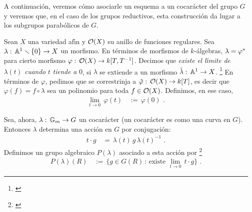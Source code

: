 \theoremstyle{plain}
\newtheorem{teoElGrupoDeUnaCurva}{Teorema}[section]
\newtheorem{propoCocaracteresYParabolicosPropios}[teoElGrupoDeUnaCurva]%
	{Proposici\'{o}n}
\newtheorem{teoParabolicoSemidirecto}[teoElGrupoDeUnaCurva]{Proposici\'{o}n}

\theoremstyle{definition}
\newtheorem{defReductivo}[teoElGrupoDeUnaCurva]{Definici\'{o}n}
\newtheorem{ejemploCurvas}[teoElGrupoDeUnaCurva]{Ejemplo}
\newtheorem{obsParabolicoSemidirecto}[teoElGrupoDeUnaCurva]{Observaci\'{o}n}


A continuaci\'{o}n, veremos c\'{o}mo asociarle un esquema a un cocar\'{a}cter
del grupo $G$ y veremos que, en el caso de los grupos reductivos, esta
construcci\'{o}n da lugar a los subgrupos parab\'{o}licos de $G$.

Sean $X$ una variedad af\'{\i}n y $\cal O(X)$ su anillo de funciones regulares.
Sea $\lambda:\,\afin[1]\setmin\{0\}\rightarrow X$ un morfismo. En t\'{e}rminos
de morfismos de $k$-\'{a}lgebras, $\lambda=\pull\varphi$ para cierto morfismo
$\varphi:\,\cal O(X)\rightarrow k[T,T^{-1}]$. Decimos que \emph{existe el %
l\'{\i}mite de $\lambda(t)$ cuando $t$ tiende a $0$}, si $\lambda$ se extiende
a un morfismo $\tilde\lambda:\,\afin[1]\rightarrow X$.%
\footnote{
	\cite[\S~13.b]{MilneAlgebraicGroups}
}
En t\'{e}rminos de $\varphi$, pedimos que se correstrinja a
$\tilde\varphi:\,\cal O(X)\rightarrow k[T]$, es decir que
$\varphi(f)=f\circ\lambda$ sea un polinomio para toda $f\in\cal O(X)$.
Definimos, en ese caso,
\begin{align*}
	\lim_{t\to 0}\,\varphi(t) & \,:=\,\varphi(0)
	\text{ .}
\end{align*}
%

Sea, ahora, $\lambda:\,\multiplicativo\rightarrow G$ un cocar\'{a}cter (un
cocar\'{a}cter es como una curva en $G$). Entonces $\lambda$ determina una
acci\'{o}n en $G$ por conjugaci\'{o}n:
\begin{align*}
	t\cdot g & \,=\,\lambda(t)\,g\,\lambda(t)^{-1}
	\text{ .}
\end{align*}
%
Definimos un grupo algebraico $P(\lambda)$ asociado a esta acci\'{o}n por%
\footnote{
	\cite[Proposition~13.28]{MilneAlgebraicGroups}
}
\begin{align*}
	P(\lambda)(R) & \,:=\,\Big\{g\in G(R)\,:\,\text{existe }
		\lim_{t\to 0}\,t\cdot g\Big\}
	\text{ .}
\end{align*}
%

